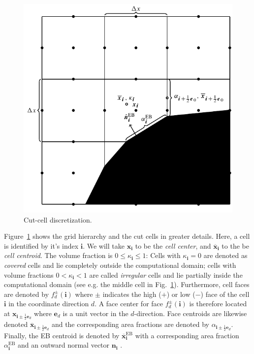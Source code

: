 \documentclass[3p]{elsarticle}
\begin{document}
\begin{figure}[ht]
    \centering
    \includegraphics{./figures/spatial_discretization}
    \caption{Cut-cell discretization.}
    \label{fig:spatial_discretization}
\end{figure}

Figure~\ref{fig:spatial_discretization} shows the grid hierarchy and the cut cells in greater details. Here, a cell is identified by it's index $\bm{i}$. We will take $\bm{x}_{\bm{i}}$ to be the \emph{cell center}, and $\overline{\bm{x}}_{\bm{i}}$ to the be \emph{cell centroid}. The volume fraction is $0 \leq \kappa_{\bm{i}} \leq 1$: Cells with $\kappa_{\bm{i}} = 0$ are denoted as \emph{covered} cells and lie completely outside the computational domain; cells with volume fractions $0 < \kappa_{\bm{i}} < 1$ are called \emph{irregular} cells and lie partially inside the computational domain (see e.g. the middle cell in Fig.~\ref{fig:spatial_discretization}). Furthermore, cell faces are denoted by $f^\pm_d(\bm{i})$ where $\pm$ indicates the high ($+$) or low ($-$) face of the cell $\bm{i}$ in the coordinate direction $d$. A face center for face $f^\pm_d(\bm{i})$ is therefore located at $\bm{x}_{\bm{i} \pm \frac{1}{2}\mathbf{e}_d}$ where $\mathbf{e}_d$ is a unit vector in the $d$-direction. Face centroids are likewise denoted $\overline{\bm{x}}_{\bm{i} \pm \frac{1}{2}\mathbf{e}_d}$ and the corresponding area fractions are denoted by $\alpha_{\bm{i}\pm\frac{1}{2}\bm{e}_d}$. Finally, the EB centroid is denoted by $\overline{\bm{x}}_{\bm{i}}^{\text{EB}}$ with a corresponding area fraction $\alpha^{\text{EB}}_{\bm{i}}$ and an outward normal vector $\bm{n}_{\bm{i}}$ .
\end{document}
